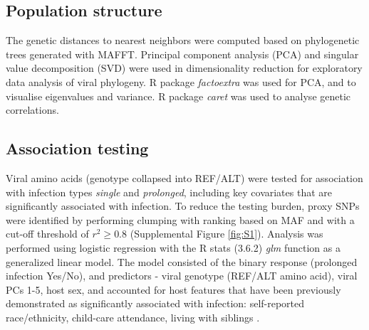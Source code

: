 \documentclass{article} %
\begin{document}
\subsection{Population structure}
The genetic distances to nearest neighbors were computed based on phylogenetic 
trees generated with MAFFT.
Principal component analysis (PCA) and singular value decomposition (SVD) were used in dimensionality reduction for exploratory data analysis of viral phylogeny.
R package \textit{factoextra} was used for PCA, and to visualise eigenvalues and variance. 
R package \textit{caret} was used to analyse genetic correlations.

\subsection{Association testing}
Viral amino acids (genotype collapsed into REF/ALT) were tested for association with infection types \textit{single} and \textit{prolonged}, 
including key covariates that are significantly associated with infection.
To reduce the testing burden, proxy SNPs were identified by
performing clumping with ranking based on MAF and with a cut-off threshold of $r^2 \ge 0.8$ 
(Supplemental Figure \ref{fig:S1}).
Analysis was performed using logistic regression with the
R stats (3.6.2) \textit{glm} function as a generalized linear model.
The model consisted of the binary response (prolonged infection Yes/No), and predictors - viral genotype (REF/ALT amino acid), viral PCs 1-5, host sex, and accounted for host features that have been previously demonstrated as significantly associated with infection: 
self-reported race/ethnicity, child-care attendance, living with siblings 
\citep{rosas2022upper}.

\end{document}
